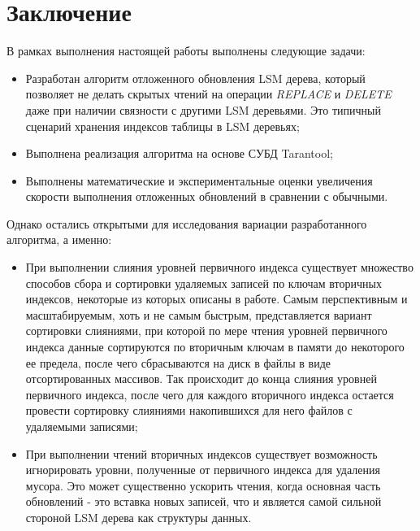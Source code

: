 \documentclass[a4paper,hidelinks,12pt]{article}
\begin{document}
\section{Заключение}
В рамках выполнения настоящей работы выполнены следующие задачи:
\begin{itemize}
\item Разработан алгоритм отложенного обновления LSM дерева, который позволяет
не делать скрытых чтений на операции \textit{REPLACE} и \textit{DELETE} даже при
наличии связности с другими LSM деревьями. Это типичный сценарий хранения
индексов таблицы в LSM деревьях;
\item Выполнена реализация алгоритма на основе СУБД Tarantool;
\item Выполнены математические и экспериментальные оценки увеличения скорости
выполнения отложенных обновлений в сравнении с обычными.
\end{itemize}

Однако остались открытыми для исследования вариации разработанного алгоритма, а
именно:
\begin{itemize}
\item При выполнении слияния уровней первичного индекса существует множество
способов сбора и сортировки удаляемых записей по ключам вторичных индексов,
некоторые из которых описаны в работе. Самым перспективным и масштабируемым,
хоть и не самым быстрым, представляется вариант сортировки слияниями, при
которой по мере чтения уровней первичного индекса данные сортируются по
вторичным ключам в памяти до некоторого ее предела, после чего сбрасываются на
диск в файлы в виде отсортированных массивов. Так происходит до конца слияния
уровней первичного индекса, после чего для каждого вторичного индекса остается
провести сортировку слияниями накопившихся для него файлов с удаляемыми
записями;
\item При выполнении чтений вторичных индексов существует возможность
игнорировать уровни, полученные от первичного индекса для удаления мусора. Это
может существенно ускорить чтения, когда основная часть обновлений - это вставка
новых записей, что и является самой сильной стороной LSM дерева как структуры
данных.
\end{itemize}
\end{document}
